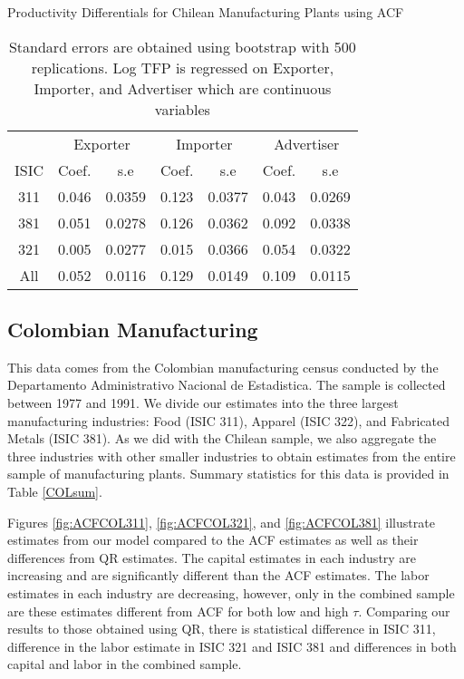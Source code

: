 \documentclass[11pt]{article}
\begin{document}
\begin{table}[H]
\centering
\caption{Productivity Differentials for Chilean Manufacturing Plants using ACF}
\begin{tabular}{ccccccc}
  \hline\hline & \multicolumn{2}{c}{Exporter}  & \multicolumn{2}{c}{Importer} & \multicolumn{2}{c}{Advertiser} \\ \cmidrule(lr){2-3} \cmidrule(lr){4-5} \cmidrule(lr){6-7}ISIC & Coef. & s.e & Coef. & s.e & Coef. & s.e \\ 
  \hline
311 & 0.046 & 0.0359 & 0.123 & 0.0377 & 0.043 & 0.0269 \\ 
  381 & 0.051 & 0.0278 & 0.126 & 0.0362 & 0.092 & 0.0338 \\ 
  321 & 0.005 & 0.0277 & 0.015 & 0.0366 & 0.054 & 0.0322 \\ 
  All & 0.052 & 0.0116 & 0.129 & 0.0149 & 0.109 & 0.0115 \\ 
   \hline
\end{tabular}
\caption*{Standard errors are obtained using bootstrap with 500 replications. Log TFP is regressed on Exporter, Importer, and Advertiser  which are continuous variables }
\end{table}




\subsection{Colombian Manufacturing}
This data comes from the Colombian manufacturing census conducted by the Departamento Administrativo Nacional de Estadistica. The sample is collected between 1977 and 1991. We divide our estimates into the three largest manufacturing industries: Food (ISIC 311), Apparel (ISIC 322), and Fabricated Metals (ISIC 381). As we did with the Chilean sample, we also aggregate the three industries with other smaller industries to obtain estimates from the entire sample of manufacturing plants. Summary statistics for this data is provided in Table \ref{COLsum}.

Figures \ref{fig:ACFCOL311}, \ref{fig:ACFCOL321}, and \ref{fig:ACFCOL381} illustrate estimates from our model compared to the ACF estimates as well as their differences from QR estimates. The capital estimates in each industry are increasing and are significantly different than the ACF estimates. The labor estimates in each industry are decreasing, however, only in the combined sample are these estimates different from ACF for both low and high $\tau$. Comparing our results to those obtained using QR, there is statistical difference in ISIC 311, difference in the labor estimate in ISIC 321 and ISIC 381 and differences in both capital and labor in the combined sample.
\end{document}
